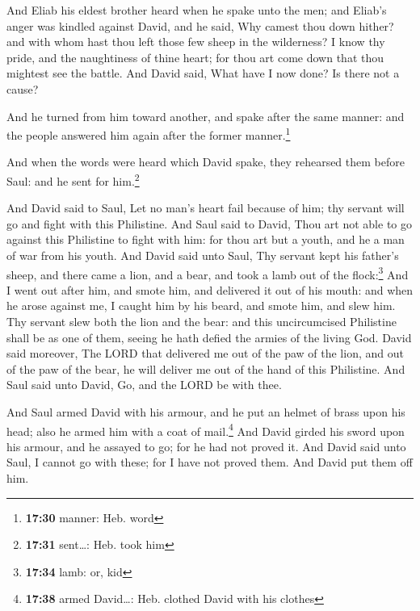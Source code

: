  And Eliab his eldest brother heard when he spake unto
the men; and Eliab's anger was kindled against David, and he said, Why
camest thou down hither? and with whom hast thou left those few sheep in
the wilderness? I know thy pride, and the naughtiness of thine heart;
for thou art come down that thou mightest see the battle.
 And David said, What have I now done? Is there not a
cause?

 And he turned from him toward another, and spake after
the same manner: and the people answered him again after the former
manner.\footnote{\textbf{17:30} manner: Heb. word}

 And when the words were heard which David spake, they
rehearsed them before Saul: and he sent for him.\footnote{\textbf{17:31}
  sent\ldots: Heb. took him}

 And David said to Saul, Let no man's heart fail because
of him; thy servant will go and fight with this Philistine.
 And Saul said to David, Thou art not able to go against
this Philistine to fight with him: for thou art but a youth, and he a
man of war from his youth.  And David said unto Saul, Thy
servant kept his father's sheep, and there came a lion, and a bear, and
took a lamb out of the flock:\footnote{\textbf{17:34} lamb: or, kid}
 And I went out after him, and smote him, and delivered
it out of his mouth: and when he arose against me, I caught him by his
beard, and smote him, and slew him.  Thy servant slew
both the lion and the bear: and this uncircumcised Philistine shall be
as one of them, seeing he hath defied the armies of the living God.
 David said moreover, The LORD that delivered me out of
the paw of the lion, and out of the paw of the bear, he will deliver me
out of the hand of this Philistine. And Saul said unto David, Go, and
the LORD be with thee.

 And Saul armed David with his armour, and he put an
helmet of brass upon his head; also he armed him with a coat of
mail.\footnote{\textbf{17:38} armed David\ldots: Heb. clothed David with
  his clothes}  And David girded his sword upon his
armour, and he assayed to go; for he had not proved it. And David said
unto Saul, I cannot go with these; for I have not proved them. And David
put them off him.

